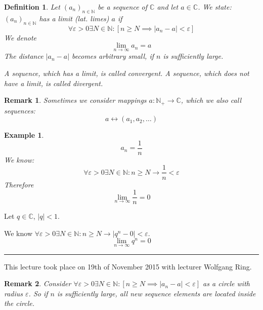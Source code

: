\documentclass[a4paper,landscape,twocolumn]{article}
\newtheorem{defi}{Definition}
\newtheorem{rem}{Remark}
\newtheorem{ex}{Example}
\newcommand\abs[1]{\left|#1\right|}
\newcommand\seq[1]{{\left(#1\right)}_{n \in \mathbb N}}
\newcommand\meta[3]{\hrule{} This #1 took place on #2 with lecturer #3.\par}
\begin{document}
\begin{defi}
  Let $\seq{a_n}$ be a sequence of $\mathbb C$ and let $a \in \mathbb C$.
  We state: $(a_n)_{n \in \mathbb N}$ has a limit (lat. limes) $a$ if
  \[ \forall \varepsilon > 0 \exists N \in \mathbb N: \left[n \geq N \implies \abs{a_n - a} < \varepsilon\right] \]
  We denote
  \[ \lim_{n \to \infty} a_n = a \]
  The distance $\abs{a_n - a}$ becomes arbitrary small, if $n$ is sufficiently large.

  A sequence, which has a limit, is called \emph{convergent}. A sequence, which does not have a limit, is called \emph{divergent}.
\end{defi}

\begin{rem}
  Sometimes we consider mappings $a: \mathbb N_+ \rightarrow \mathbb C$, which we also call sequences:
  \[ a \leftrightarrow (a_1, a_2, \ldots) \]
\end{rem}

\begin{ex}
  \[ a_n = \frac1n \]
  We know:
  \[ \forall \varepsilon > 0 \exists N \in \mathbb N: n \geq N \rightarrow \frac1n < \varepsilon \]
  Therefore
  \[ \lim_{n \to \infty} \frac1n = 0 \]
\end{ex}

Let $q \in \mathbb C$, $\abs{q} < 1$.

We know $\forall \varepsilon > 0 \exists N \in \mathbb N: n \geq N \rightarrow \abs{q^n - 0} < \varepsilon$.
\[ \lim_{n\to\infty} q^n = 0 \]

\meta{lecture}{19th of November 2015}{Wolfgang Ring}

\begin{rem}
  Consider $\forall \varepsilon > 0 \exists N \in \mathbb N: \left[n \geq N \implies \abs{a_n - a} < \varepsilon\right]$
  as a circle with radius $\varepsilon$. So if $n$ is sufficiently large,
  all new sequence elements are located inside the circle.
\end{rem}
\end{document}
